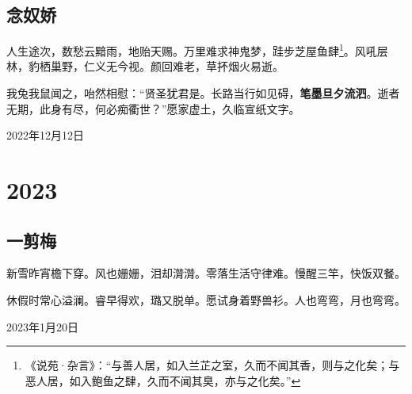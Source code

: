 \documentclass[a5paper]{ctexart}
\begin{document}
	\subsection[念奴娇（人生途次）]{念奴娇}
	人生途次，数愁云黯雨，地贻天赐。万里难求神鬼梦，跬步芝屋鱼肆\footnote{《说苑·杂言》：“与善人居，如入兰芷之室，久而不闻其香，则与之化矣；与恶人居，如入鲍鱼之肆，久而不闻其臭，亦与之化矣。”}。风吼层林，豹栖巢野，仁义无今视。颜回难老，草抔烟火易逝。
	
	我兔我鼠闻之，咍然相慰：“贤圣犹君是。长路当行如见碍，\textbf{笔墨旦夕流泗}。逝者无期，此身有尽，何必痴衢世？”愿家虚土，久临宣纸文字。
	\begin{flushright}
		2022年12月12日
	\end{flushright}
	
	\newpage
	\section{2023}
	\subsection[一剪梅（新雪昨宵檐下穿）]{一剪梅}
	新雪昨宵檐下穿。风也姗姗，泪却潸潸。零落生活守律难。慢醒三竿，快饭双餐。
	
	休假时常心溢澜。睿早得欢，璐又脱单。愿试身着野兽衫。人也弯弯，月也弯弯。
	\begin{flushright}
		2023年1月20日
	\end{flushright}
	
\end{document}
